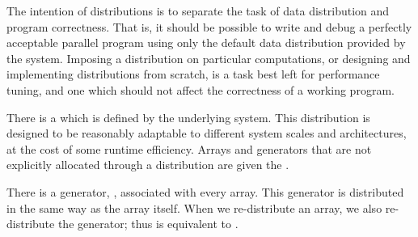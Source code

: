 The intention of distributions is to separate the task of data
distribution and program correctness.  That is, it should be possible
to write and debug a perfectly acceptable parallel program using only
the default data distribution provided by the system.  Imposing a
distribution on particular computations, or designing and implementing
distributions from scratch, is a task best left for performance
tuning, and one which should not affect the correctness of a working
program.

There is a  which is defined by the
underlying system.  This distribution is designed to be reasonably
adaptable to different system scales and architectures, at the cost of
some runtime efficiency.  Arrays and generators that are not
explicitly allocated through a distribution are given the
.

There is a generator, ,
associated with every array.  This generator is distributed in the
same way as the array itself.  When we re-distribute an array, we also
re-distribute the generator; thus
 is equivalent to
.

